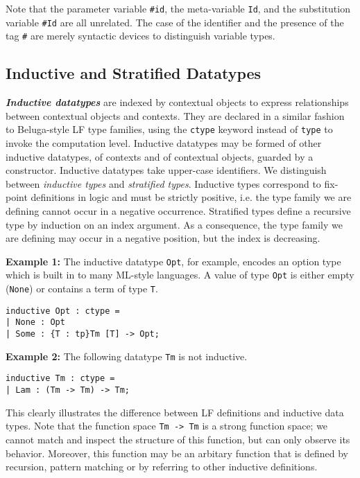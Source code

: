 \documentclass[11pt]{article}
\begin{document}
Note that the parameter variable \texttt{\#id}, the meta-variable \texttt{Id}, and the substitution variable \texttt{\#Id} are all unrelated. The case of the identifier and the presence of the tag \texttt{\#} are merely syntactic devices to distinguish variable types.

\subsection{Inductive and Stratified Datatypes}
\textbf{\textit{Inductive datatypes}} are indexed by contextual
objects to express relationships between contextual objects and
contexts. They are declared in a similar fashion to Beluga-style LF
type families, using the \texttt{ctype} keyword instead of
\texttt{type} to invoke the computation level. Inductive datatypes may
be formed of other inductive datatypes, of contexts and of contextual
objects, guarded by a constructor. Inductive datatypes take upper-case
identifiers. We distinguish between \textit{inductive types} and
\textit{stratified types}. Inductive types correspond to fix-point
definitions in logic and must be strictly positive, i.e. the type
family we are defining cannot occur in a negative
occurrence. Stratified types define a recursive type by induction on
an index argument. As a consequence, the type family we are defining
may occur in a negative position, but the index is decreasing.


\textbf{Example 1:} The inductive datatype \texttt{Opt}, for example, encodes an option type which is built in to many ML-style languages. A value of type \texttt{Opt} is either empty (\texttt{None}) or contains a term of type \texttt{T}.
\begin{verbatim}
inductive Opt : ctype =
| None : Opt
| Some : {T : tp}Tm [T] -> Opt;
\end{verbatim}

\textbf{Example 2:} The following datatype \texttt{Tm} is not inductive.
\begin{verbatim}
inductive Tm : ctype =
| Lam : (Tm -> Tm) -> Tm;
\end{verbatim}

This clearly illustrates the difference between LF definitions and
inductive data types. Note that the function space \verb+Tm -> Tm+
is a strong function space; we cannot match and inspect the structure
of this function, but can only observe its behavior. Moreover, this
function may be an arbitary function that is defined by recursion,
pattern matching or by referring to other inductive definitions.
\end{document}
